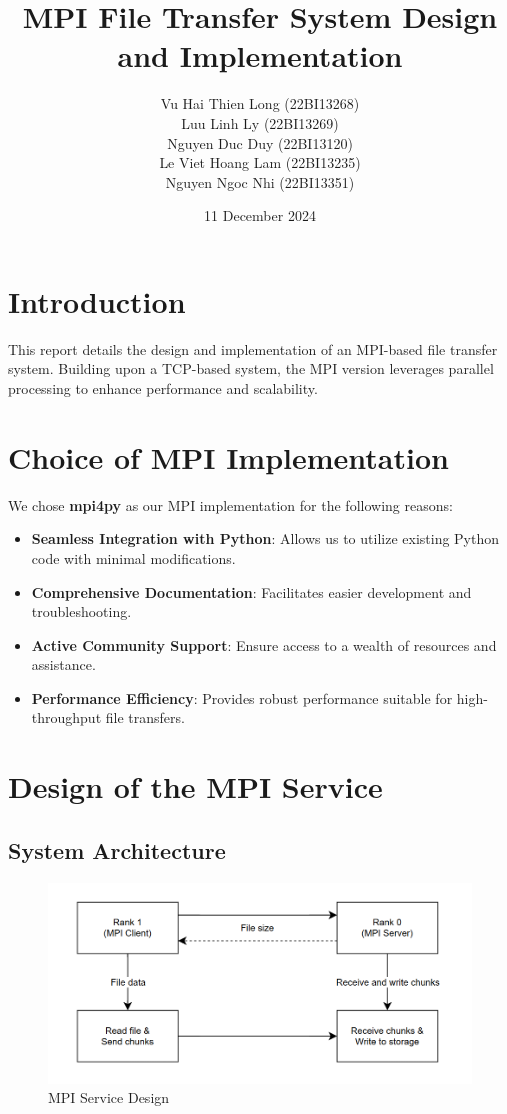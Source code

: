 \documentclass{article}
\title{MPI File Transfer System Design and Implementation}
\author{
    Vu Hai Thien Long (22BI13268) \\
    Luu Linh Ly (22BI13269) \\
    Nguyen Duc Duy (22BI13120) \\
    Le Viet Hoang Lam (22BI13235) \\
    Nguyen Ngoc Nhi (22BI13351)
}
\date{11 December 2024}
\begin{document}
\maketitle

\section{Introduction}

This report details the design and implementation of an MPI-based file transfer system. Building upon a TCP-based system, the MPI version leverages parallel processing to enhance performance and scalability.

\section{Choice of MPI Implementation}

We chose \textbf{mpi4py} as our MPI implementation for the following reasons:
\begin{itemize}
    \item \textbf{Seamless Integration with Python}: Allows us to utilize existing Python code with minimal modifications.
    \item \textbf{Comprehensive Documentation}: Facilitates easier development and troubleshooting.
    \item \textbf{Active Community Support}: Ensure access to a wealth of resources and assistance.
    \item \textbf{Performance Efficiency}: Provides robust performance suitable for high-throughput file transfers.
\end{itemize}

\section{Design of the MPI Service}

\subsection{System Architecture}

\begin{figure}[h!]
    \centering
    \includegraphics[width=1\textwidth]{mpi_service_design.png}
    \caption{MPI Service Design}
    \label{fig:mpi_service_design}
\end{figure}
\end{document}
